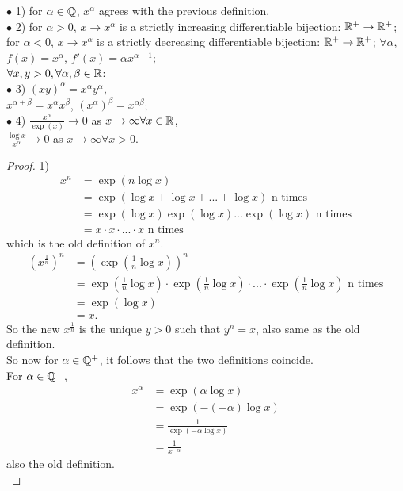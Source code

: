 \documentclass[a4paper]{article}
\begin{document}
\begin{thm}
$\bullet$ 1) for $\alpha \in \mathbb{Q}$, $x^\alpha$ agrees with the previous definition.\\
$\bullet$ 2) for $\alpha > 0$, $x\to x^\alpha$ is a strictly increasing differentiable bijection: $\mathbb{R}^+\to\mathbb{R}^+$;\\
for $\alpha < 0$, $x\to x^\alpha$ is a strictly decreasing differentiable bijection: $\mathbb{R}^+\to\mathbb{R}^+$;
$\forall \alpha$, $f\left(x\right)=x^\alpha$, $f'\left(x\right)=\alpha x^{\alpha-1}$;\\

$\forall x,y>0, \forall \alpha,\beta\in\mathbb{R}$:\\
$\bullet$ 3) $\left(xy\right)^\alpha = x^\alpha y^\alpha$,\\
$x^{\alpha+\beta} = x^\alpha x^\beta$,
$\left(x^\alpha\right)^\beta = x^{\alpha\beta}$;\\
$\bullet$ 4) $\frac{x^\alpha}{\exp\left(x\right)} \to 0$ as $x\to \infty \forall x\in\mathbb{R}$,\\
$\frac{\log x}{x^\alpha} \to 0$ as $x\to\infty \forall x>0$.
\begin{proof}
1)
\begin{equation*}
\begin{aligned}
x^n&=\exp\left(n\log x\right)\\
&= \exp\left(\log x+\log x+...+\log x\right) \text{ n times}\\
&= \exp\left(\log x\right)\exp\left(\log x\right)...\exp\left(\log x\right) \text{ n times}\\
&= x\cdot x\cdot...\cdot x \text{ n times}
\end{aligned}
\end{equation*}
which is the old definition of $x^n$.\\
\begin{equation*}
\begin{aligned}
\left(x^\frac{1}{n}\right)^n &= \left(\exp\left(\frac{1}{n}\log x\right)\right)^n\\
&= \exp\left(\frac{1}{n}\log x\right)\cdot\exp\left(\frac{1}{n}\log x\right)\cdot...\cdot\exp\left(\frac{1}{n}\log x\right) \text{ n times}\\
&= \exp\left(\log x\right)\\
&= x.
\end{aligned}
\end{equation*}
So the new $x^\frac{1}{n}$ is the unique $y>0$ such that $y^n=x$, also same as the old definition.\\
So now for $\alpha\in\mathbb{Q}^+$, it follows that the two definitions coincide.\\
For $\alpha\in\mathbb{Q}^-$,
\begin{equation*}
\begin{aligned}
x^\alpha &= \exp\left(\alpha \log x\right)\\
&= \exp\left(-\left(-\alpha\right)\log x\right)\\
&= \frac{1}{\exp\left(-\alpha \log x\right)}\\
&= \frac{1}{x^{-\alpha}}
\end{aligned}
\end{equation*}
also the old definition.\\


\end{proof}
\end{thm}
\end{document}
